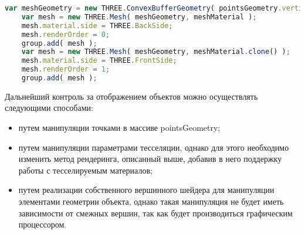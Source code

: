 \begin{lstlisting}[language=TypeScript, label=lst:dev:setup]
    var meshGeometry = new THREE.ConvexBufferGeometry( pointsGeometry.vertices );
    var mesh = new THREE.Mesh( meshGeometry, meshMaterial );
    mesh.material.side = THREE.BackSide;
    mesh.renderOrder = 0;
    group.add( mesh );
    var mesh = new THREE.Mesh( meshGeometry, meshMaterial.clone() );
    mesh.material.side = THREE.FrontSide;
    mesh.renderOrder = 1;
    group.add( mesh );
\end{lstlisting}

Дальнейший контроль за отображением объектов можно осуществлять следующими способами:

\begin{itemize}
\item путем манипуляции точками в массиве pointsGeometry;
\item путем манипуляции параметрами тесселяции, однако для этого необходимо изменить метод рендеринга,
описанный выше, добавив в него поддержку работы с тесселируемым материалов;
\item путем реализации собственного вершинного шейдера для манипуляции элементами геометрии объекта, однако
такая манипуляция не будет иметь зависимости от смежных вершин, так как будет производиться графическим процессором.
\end{itemize}
